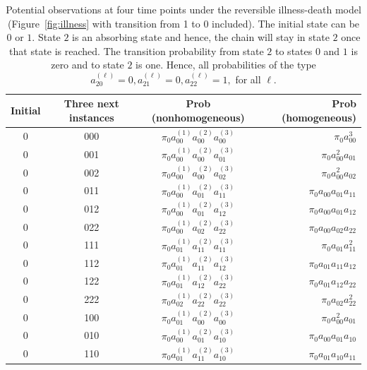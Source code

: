 \documentclass[11pt, a4paper]{article}
\numberwithin{equation}{section}
\theoremstyle{plain}
\theoremstyle{definition}
\begin{document}
{\begin{table}[!ht]
    \centering 
  \caption{Potential observations at four time points under the reversible illness-death model (Figure~\ref{fig:illness} with transition from 1 to 0 included). The initial state can be $0$ or $1$. State $2$ is an absorbing state and hence, the chain will stay in state $2$ once that state is reached. The transition probability from state $2$ to states $0$ and $1$ is zero and to state $2$ is one. Hence, all probabilities of the type $a_{20}^{(\ell)} = 0, a_{21}^{(\ell)} = 0, a_{22}^{(\ell)} = 1,$ for all $\ell$.}
\label{tab:Revobsevations4}
    \begin{tabular}{c|c|c|r}
    \hline
        Initial & Three next instances & Prob (nonhomogeneous) & Prob (homogeneous)\\
        \hline
        0 & 000 & $\pi_0a_{00}^{(1)} a_{00}^{(2)} a_{00}^{(3)}$ & $\pi_0a_{00}^3$ \\
        0 & 001  & $\pi_0a_{00}^{(1)} a_{00}^{(2)} a_{01}^{(3)}$ & $\pi_0a_{00}^2 a_{01}$ \\
        0 & 002  & $\pi_0a_{00}^{(1)} a_{00}^{(2)} a_{02}^{(3)}$ & $\pi_0a_{00}^2 a_{02}$ \\
        0 & 011  & $\pi_0a_{00}^{(1)} a_{01}^{(2)} a_{11}^{(3)}$ & $\pi_0a_{00} a_{01} a_{11}$ \\
        0 & 012  & $\pi_0a_{00}^{(1)} a_{01}^{(2)} a_{12}^{(3)}$ & $\pi_0a_{00} a_{01} a_{12}$ \\
        0 & 022  & $\pi_0a_{00}^{(1)} a_{02}^{(2)} a_{22}^{(3)}$ & $\pi_0a_{00} a_{02} a_{22}$ \\
        0 & 111  & $\pi_0a_{01}^{(1)} a_{11}^{(2)} a_{11}^{(3)}$ & $\pi_0a_{01} a_{11}^2$ \\
        0 & 112  & $\pi_0a_{01}^{(1)} a_{11}^{(2)} a_{12}^{(3)}$ & $\pi_0a_{01} a_{11} a_{12}$ \\
        0 & 122  & $\pi_0a_{01}^{(1)} a_{12}^{(2)} a_{22}^{(3)}$ & $\pi_0a_{01} a_{12} a_{22}$\\
        0 & 222  & $\pi_0a_{02}^{(1)} a_{22}^{(2)} a_{22}^{(3)}$ & $\pi_0a_{02} a_{22}^2$\\
        0 & 100  & $\pi_0a_{01}^{(1)} a_{00}^{(2)} a_{00}^{(3)}$ & $\pi_0a_{00}^2 a_{01}$ \\
        0 & 010  & $\pi_0a_{00}^{(1)} a_{01}^{(2)} a_{10}^{(3)}$ & $\pi_0a_{00} a_{01} a_{10}$ \\
        0 & 110  & $\pi_0a_{01}^{(1)} a_{11}^{(2)} a_{10}^{(3)}$ & $\pi_0a_{01} a_{10} a_{11}$ \\        

\end{tabular}
\end{table}}
\end{document}
